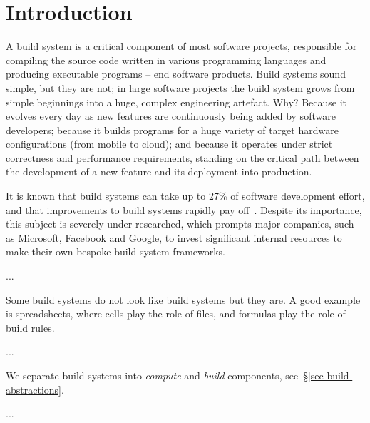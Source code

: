 \section{Introduction}\label{sec-intro}

A build system is a critical component of most software projects, responsible
for compiling the source code written in various programming languages and
producing executable programs -- end software products. Build systems sound
simple, but they are not; in large software projects the build system grows from
simple beginnings into a huge, complex engineering artefact. Why? Because it
evolves every day as new features are continuously being added by software
developers; because it builds programs for a huge variety of target hardware
configurations (from mobile to cloud); and because it operates under strict
correctness and performance requirements, standing on the critical path between
the development of a new feature and its deployment into production.

It is known that build systems can take up to 27\% of software development
effort, and that improvements to build systems rapidly pay off~\cite{build_maintenance}.
Despite its importance, this subject is severely under-researched, which prompts
major companies, such as Microsoft, Facebook and Google, to invest significant
internal resources to make their own bespoke build system frameworks.

...

Some build systems do not look like build systems but they are. A good example
is spreadsheets, where cells play the role of files, and formulas play the role
of build rules.

...

We separate build systems into \emph{compute} and \emph{build} components,
see~\S\ref{sec-build-abstractions}.

...